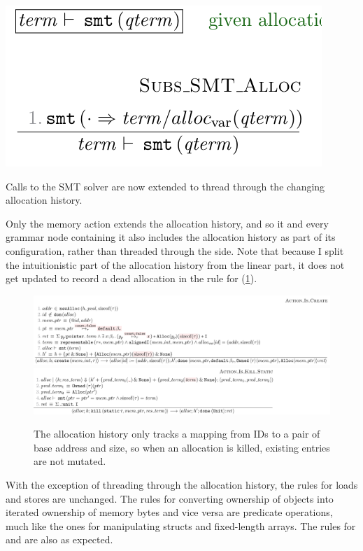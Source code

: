 \begin{marginfigure}
    \includegraphics{figures/mem-model-dyn-smt}
    \caption{Calls to the SMT solver are now extended to thread through the
        changing allocation history.}\label{fig:mem-model-dyn-smt}
\end{marginfigure}

Only the  memory action extends the allocation history, and
so it and every grammar node containing it also includes the allocation history
as part of its configuration, rather than threaded through the
side. Note that
because I split the intuitionistic part of the allocation history from the
linear part, it does not get updated to record a dead allocation in the
rule for  (\cref{fig:mem-model-dyn-create-kill}).

\begin{figure}
    \includegraphics{figures/mem-model-dyn-create}
    \includegraphics{figures/mem-model-dyn-kill}
    \caption{The allocation history only tracks a mapping from IDs to a pair of
        base address and size, so when an allocation is killed, existing entries
        are not mutated.}\label{fig:mem-model-dyn-create-kill}
\end{figure}

With the exception of threading through the allocation history, the rules for
loads and stores are unchanged. The rules for converting ownership of objects
into iterated ownership of memory bytes and vice versa are predicate
operations, much like the ones for manipulating structs and fixed-length
arrays. The rules for  and
 are also as expected.

